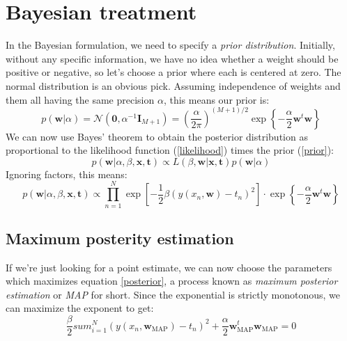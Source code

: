 \documentclass[12pt, a4paper]{article}
\numberwithin{equation}{section}
\begin{document}
\section{Bayesian treatment}
In the Bayesian formulation, we need to specify a \textit{prior distribution}. Initially, without any specific information, we have no idea whether a weight should be positive or negative, so let's choose a prior where each is centered at zero. The normal distribution is an obvious pick. Assuming independence of weights and them all having the same precision $\alpha$, this means our prior is:
\begin{equation}
p(\mathbf{w}|\alpha)=\mathcal{N}(\mathbf{0},\alpha^{-1}\mathbf{I}_{M+1})=\left(\frac{\alpha}{2\pi}\right)^{(M+1)/2}\exp\left\{-\frac{\alpha}{2}\mathbf{w}^t\mathbf{w}\right\}
\label{prior}
\end{equation}
We can now use Bayes' theorem to obtain the posterior distribution as proportional to the likelihood function (\ref{likelihood}) times the prior (\ref{prior}):
\begin{equation}
p(\mathbf{w}|\alpha,\beta,\mathbf{x},\mathbf{t})\propto L(\beta,\mathbf{w}|\mathbf{x},\mathbf{t})p(\mathbf{w}|\alpha)
\end{equation}
Ignoring factors, this means:
\begin{equation}
p(\mathbf{w}|\alpha,\beta,\mathbf{x},\mathbf{t})\propto\prod_{n=1}^N\exp\left[-\frac{1}{2}\beta(y(x_n,\mathbf{w})-t_n)^2\right]\cdot\exp\left\{-\frac{\alpha}{2}\mathbf{w}^t\mathbf{w}\right\}
\label{posterior}
\end{equation}

\subsection{Maximum posterity estimation}
If we're just looking for a point estimate, we can now choose the parameters which maximizes equation \ref{posterior}, a process known as \textit{maximum posterior estimation} or \textit{MAP} for short. Since the exponential is strictly monotonous, we can maximize the exponent to get:
\begin{equation}
\frac{\beta}{2}sum_{i=1}^N(y(x_n,\mathbf{w}_{\textrm{MAP}})-t_n)^2+\frac{\alpha}{2}\mathbf{w}_{\textrm{MAP}}^t\mathbf{w}_{\textrm{MAP}}=0
\end{equation}
\end{document}
